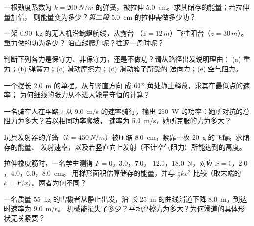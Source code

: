 \begin{exercise}[$\star$]\label{exo:g12:work-and-energy:1}
一根劲度系数为 $k = \qty{200}{N/m}$ 的弹簧，被拉伸
\qty{5.0}{cm}。求其储存的能量；若拉伸量加倍，
则能量变为多少？\emph{第二段} \qty{5.0}{cm} 的拉伸需做多少功？
\end{exercise}

\begin{exercise}[$\star$]\label{exo:g12:work-and-energy:2}
一架 \qty{0.90}{kg} 的无人机沿蜿蜒航线，从露台
（$z = \qty{12}{m}$）飞往阳台（$z = \qty{30}{m}$）。重力做的功为多少？
沿直线爬升呢？往返一周时呢？
\end{exercise}

\begin{exercise}[$\star$]\label{exo:g12:work-and-energy:3}
判断下列各力是保守力、非保守力，还是不做功？请从路径出发说明理由：
(a) 重力；(b) 弹簧力；(c) 滑动摩擦力；(d) 滑动箱子所受的
法向力；(e) 空气阻力。
\end{exercise}

\begin{exercise}[$\star$]\label{exo:g12:work-and-energy:4}
一个摆长 \qty{2.0}{m} 的单摆，从与竖直方向
成 $\qty{60}{\degree}$ 角处静止释放，求其在最低点的速率；
为何细线的张力从不进入能量守恒的计算？
\end{exercise}

\begin{exercise}[$\star$]\label{exo:g12:work-and-energy:5}
一名骑车人在平路上以 \qty{9.0}{m/s} 的速率骑行，输出
\qty{250}{W} 的功率：她所对抗的总阻力为多大？若以相同功率爬坡，
速率为 \qty{5.0}{m/s}，她所克服的力为多大？
\end{exercise}

\begin{exercise}[$\star\star$]\label{exo:g12:work-and-energy:6}
玩具发射器的弹簧（$k = \qty{450}{N/m}$）被压缩
\qty{8.0}{cm}，紧靠一枚 \qty{20}{g} 的飞镖。求储存的能量、
发射速率，以及若竖直向上发射（不计空气阻力）所能达到的高度。
\end{exercise}

\begin{exercise}[$\star\star$]\label{exo:g12:work-and-energy:7}
拉伸橡皮筋时，一名学生测得 $F = 0$，$3.0$，$7.0$，
$12.0$，\qty{18.0}{N}，对应 $x = 0$，$2.0$，$4.0$，$6.0$，\qty{8.0}{cm}。
用梯形面积估算储存的能量，并与
$\tfrac12 kx^2$ 比较（取末端的 $k = F/x$）。两者为何不同？
\end{exercise}

\begin{exercise}[$\star\star$]\label{exo:g12:work-and-energy:8}
一名质量 \qty{55}{kg} 的雪橇者从静止出发，沿
长 \qty{25}{m} 的曲线滑道下降 \qty{8.0}{m}，到达时速率为 \qty{9.0}{m/s}。
机械能损失了多少？平均摩擦力为多大？为何滑道的具体形状无关紧要？
\end{exercise}

